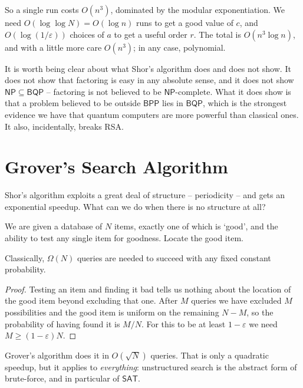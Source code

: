 \documentclass[a4paper]{scrartcl}
\newcommand{\class}[1]{\mathsf{#1}}
\begin{document}
So a single run costs $O(n^3)$, dominated by the modular exponentiation. We need $O(\log\log N) = O(\log n)$ runs to get a good value of $c$, and $O(\log(1/\varepsilon))$ choices of $a$ to get a useful order $r$. The total is $O(n^3\log n)$, and with a little more care $O(n^3)$; in any case, polynomial.

\begin{remark}
	It is worth being clear about what Shor's algorithm does and does not show. It does not show that factoring is easy in any absolute sense, and it does not show $\class{NP}\subseteq\class{BQP}$ -- factoring is not believed to be $\class{NP}$-complete. What it does show is that a problem believed to be outside $\class{BPP}$ lies in $\class{BQP}$, which is the strongest evidence we have that quantum computers are more powerful than classical ones. It also, incidentally, breaks RSA.
\end{remark}

\section{Grover's Search Algorithm}\label{sec:grover}

Shor's algorithm exploits a great deal of structure -- periodicity -- and gets an exponential speedup. What can we do when there is no structure at all?

\begin{problem*}
	We are given a database of $N$ items, exactly one of which is `good', and the ability to test any single item for goodness. Locate the good item.
\end{problem*}

\begin{proposition}
	Classically, $\Omega(N)$ queries are needed to succeed with any fixed constant probability.
\end{proposition}

\begin{proof}
	Testing an item and finding it bad tells us nothing about the location of the good item beyond excluding that one. After $M$ queries we have excluded $M$ possibilities and the good item is uniform on the remaining $N - M$, so the probability of having found it is $M/N$. For this to be at least $1-\varepsilon$ we need $M\geq(1-\varepsilon)N$.
\end{proof}

Grover's algorithm does it in $O(\sqrt N)$ queries. That is only a quadratic speedup, but it applies to \emph{everything}: unstructured search is the abstract form of brute-force, and in particular of $\mathsf{SAT}$.
\end{document}
